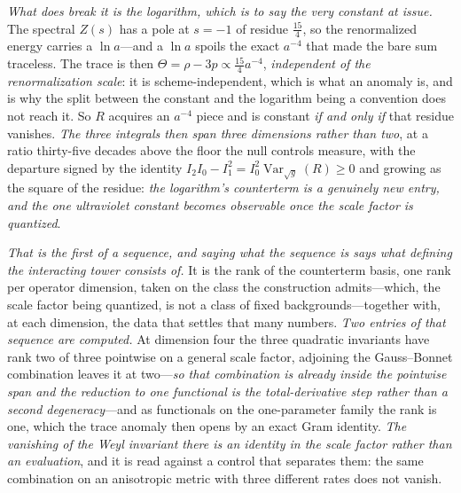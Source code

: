 \documentclass[11pt,a4paper]{article}
\theoremstyle{plain}
\theoremstyle{definition}
\theoremstyle{remark}
\begin{document}
\emph{What does break it is the logarithm, which is to say the very constant at issue.} The spectral
$Z(s)$ has a pole at $s=-1$ of residue $\tfrac{15}{4}$, so the renormalized energy carries a
$\ln a$---and a $\ln a$ spoils the exact $a^{-4}$ that made the bare sum traceless. The trace is then
$\Theta=\rho-3p\propto\tfrac{15}{4}a^{-4}$, \emph{independent of the renormalization scale}: it is
scheme-independent, which is what an anomaly is, and is why the split between the constant and the
logarithm being a convention does not reach it. So $R$ acquires an $a^{-4}$ piece and is constant
\emph{if and only if} that residue vanishes. \emph{The three integrals then span three dimensions rather
than two}, at a ratio thirty-five decades above the floor the null controls measure, with the departure
signed by the identity $I_{2}I_{0}-I_{1}^{2}=I_{0}^{2}\operatorname{Var}_{\sqrt g}(R)\ge0$ and growing as
the square of the residue: \emph{the logarithm's counterterm is a genuinely new entry, and the one
ultraviolet constant becomes observable once the scale factor is
quantized}.

\emph{That is the first of a sequence, and saying what the sequence is says what defining the
interacting tower consists of.} It is the rank of the counterterm basis, one rank per operator
dimension, taken on the class the construction admits---which, the scale factor being quantized, is not
a class of fixed backgrounds---together with, at each dimension, the data that settles that many
numbers. \emph{Two entries of that sequence are computed.} At dimension four the three quadratic
invariants have rank two of three pointwise on a general scale factor, adjoining the Gauss--Bonnet
combination leaves it at two---\emph{so that combination is already inside the pointwise span and the
reduction to one functional is the total-derivative step rather than a second degeneracy}---and as
functionals on the one-parameter family the rank is one, which the trace anomaly then opens by an exact
Gram identity. \emph{The vanishing of the Weyl invariant there is an identity in the scale factor rather
than an evaluation}, and it is read against a control that separates them: the same combination on an
anisotropic metric with three different rates does not vanish.
\end{document}
